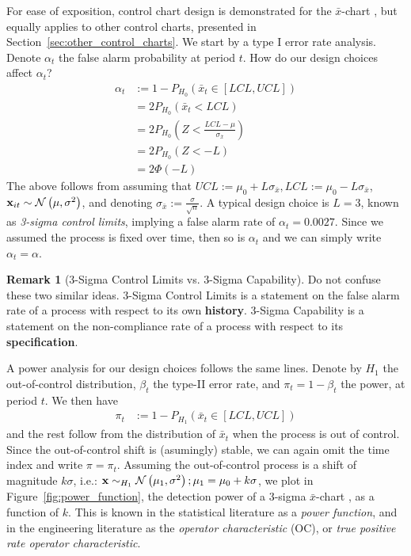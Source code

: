 \documentclass[12pt,a4paper]{report}
\theoremstyle{plain}
\theoremstyle{definition}
\newtheorem{remark}{Remark}
\newcommand{\barxChart}{$\bar{x}$-chart }
\newcommand{\sigmabar}{\sigma_{\bar{x}}}
\newcommand{\arm}{L}
\begin{document}
For ease of exposition, control chart design is demonstrated for the \barxChart, but equally applies to other control charts, presented in Section~\ref{sec:other_control_charts}.
We start by a type I error rate analysis. 
Denote $\alpha_t$ the false alarm probability at period $t$.
How do our design choices affect $\alpha_t$?
\begin{align}
	\alpha_t &:= 1-P_{H_0}(\bar{x}_t \in [LCL,UCL]) \\
	&= 2 P_{H_0}(\bar{x}_t<LCL) \\
	&= 2 P_{H_0}(Z<\frac{LCL-\mu}{\sigma_{\bar{x}}}) \\
	&= 2 P_{H_0}(Z < -\arm) \\
	&= 2 \Phi(-L)
\end{align}
The above follows from assuming that $UCL:=\mu_0 + \arm \sigmabar, LCL:= \mu_0 - \arm \sigmabar$, $\mathbf{x}_{it}\sim \mathcal{N}\left(\mu,\sigma^2\right)$, and denoting $\sigmabar:= \frac{\sigma}{\sqrt{n}}$.
A typical design choice is $\arm=3$, known as \emph{3-sigma control limits}, implying a false alarm rate of $\alpha_t=0.0027$.
Since we assumed the process is fixed over time, then so is $\alpha_t$ and we can simply write $\alpha_t=\alpha$.

\begin{remark}[3-Sigma Control Limits vs. 3-Sigma Capability]
Do not confuse these two similar ideas.
3-Sigma Control Limits is a statement on the false alarm rate of a process with respect to its own \textbf{history}.
3-Sigma Capability is a statement on the non-compliance rate of a process with respect to its \textbf{specification}.
\end{remark}


A power analysis for our design choices follows the same lines.
Denote by $H_1$ the out-of-control distribution,  $\beta_t$ the type-II error rate, and $\pi_t=1-\beta_t$ the power, at period $t$.
We then have
\begin{align}
	\pi_t &:= 1-P_{H_1}(\bar{x}_t \in [LCL,UCL])
\end{align}
and the rest follow from the distribution of $\bar{x}_t$ when the process is out of control.
Since the out-of-control shift is (asumingly) stable, we can again omit the time index and write $\pi=\pi_t$.
Assuming the out-of-control process is a shift of magnitude $k \sigma$, i.e.: $\mathbf{x} \sim_{H_1} \mathcal{N}\left(\mu_1,\sigma^2\right); \mu_1=\mu_0+ k \sigma$, we plot in Figure~\ref{fig:power_function}, the detection power of a 3-sigma \barxChart, as a function of $k$. 
This is known in the statistical literature as a \emph{power function}, and in the engineering literature as the \emph{operator characteristic} (OC), or \emph{true positive rate operator characteristic}.
\end{document}

